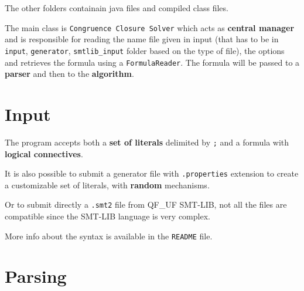 \documentclass[11pt,a4paper]{article}
\begin{document}
    The other folders containain java files and compiled class files.

    The main class is \texttt{Congruence Closure Solver} which acts as \textbf{central manager} and is responsible for reading the name file given in input (that has to be in \texttt{input}, \texttt{generator}, \texttt{smtlib\_input} folder based on the type of file), the options and retrieves the formula using a \texttt{FormulaReader}. The formula will be passed to a \textbf{parser} and then to the \textbf{algorithm}.

    \section{Input}

    The program accepts both a \textbf{set of literals} delimited by \texttt{;} and a formula with \textbf{logical connectives}.

    It is also possible to submit a generator file with \texttt{.properties} extension to create a customizable set of literals, with \textbf{random} mechanisms.

    Or to submit directly a \texttt{.smt2} file from QF\_UF SMT-LIB, not all the files are compatible since the SMT-LIB language is very complex.

    More info about the syntax is available in the \texttt{README} file.

    \section{Parsing}
\end{document}
